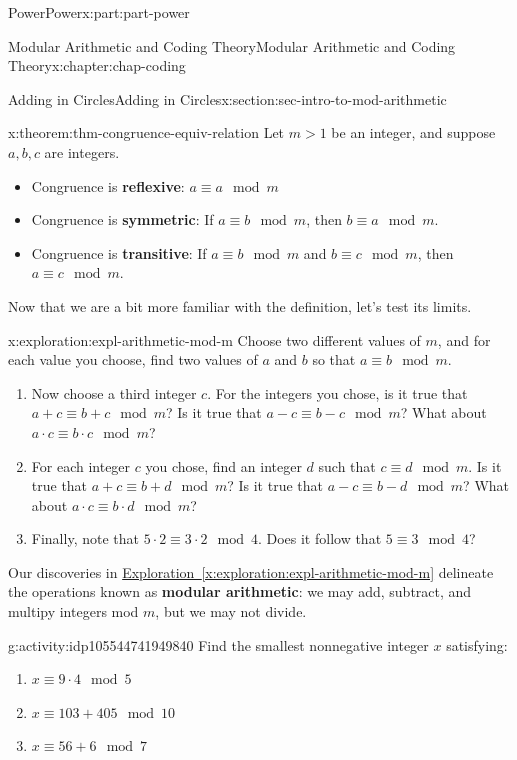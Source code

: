 \documentclass[oneside,10pt,]{book}
\newcommand{\xreffont}{\relax}
\newcommand{\terminology}[1]{\textbf{#1}}
\numberwithin{equation}{section}
\newcommand{\gt}{>}
\begin{document}
\begin{partptx}{Power}{}{Power}{}{}{x:part:part-power}
\begin{chapterptx}{Modular Arithmetic and Coding Theory}{}{Modular Arithmetic and Coding Theory}{}{}{x:chapter:chap-coding}
\begin{sectionptx}{Adding in Circles}{}{Adding in Circles}{}{}{x:section:sec-intro-to-mod-arithmetic}
\begin{theorem}{}{}{x:theorem:thm-congruence-equiv-relation}%
Let \(m\gt 1\) be an integer, and suppose \(a,b,c\) are integers.%
%
\begin{itemize}[label=\textbullet]
\item{}Congruence is \terminology{reflexive}: \(a\equiv a\mod m\)%
\item{}Congruence is \terminology{symmetric}: If \(a\equiv b\mod m\), then \(b\equiv a\mod m\).%
\item{}Congruence is \terminology{transitive}: If \(a\equiv b\mod m\) and \(b\equiv c\mod m\), then \(a\equiv c\mod m\).%
\end{itemize}
\end{theorem}
Now that we are a bit more familiar with the definition, let's test its limits.%
\begin{exploration}{}{x:exploration:expl-arithmetic-mod-m}%
Choose two different values of \(m\), and for each value you choose, find two values of \(a\) and \(b\) so that \(a\equiv b\mod m\).%
%
\begin{enumerate}
\item{}Now choose a third integer \(c\). For the integers you chose, is it true that \(a+c \equiv b+c\mod m\)? Is it true that \(a-c \equiv b-c\mod m\)? What about \(a\cdot c\equiv b\cdot c\mod m\)?%
\item{}For each integer \(c\) you chose, find an integer \(d\) such that \(c\equiv d\mod m\). Is it true that \(a+c \equiv b+d\mod m\)? Is it true that \(a-c \equiv b-d\mod m\)? What about \(a\cdot c \equiv b\cdot d\mod m\)?%
\item{}Finally, note that \(5\cdot 2 \equiv 3\cdot 2\mod 4\). Does it follow that \(5\equiv 3\mod 4\)?%
\end{enumerate}
\end{exploration}%
Our discoveries in \hyperref[x:exploration:expl-arithmetic-mod-m]{Exploration~{\xreffont\ref{x:exploration:expl-arithmetic-mod-m}}} delineate the operations known as \terminology{modular arithmetic}: we may add, subtract, and multipy integers mod \(m\), but we may not divide.%
\begin{activity}{}{g:activity:idp105544741949840}%
Find the smallest nonnegative integer \(x\) satisfying:%
%
\begin{enumerate}
\item{}\(\displaystyle x\equiv 9\cdot 4\mod 5\)%
\item{}\(\displaystyle x\equiv 103+405\mod 10\)%
\item{}\(\displaystyle x \equiv 56 + 6\mod 7\)%

\end{enumerate}
\end{activity}
\end{sectionptx}
\end{chapterptx}
\end{partptx}
\end{document}
